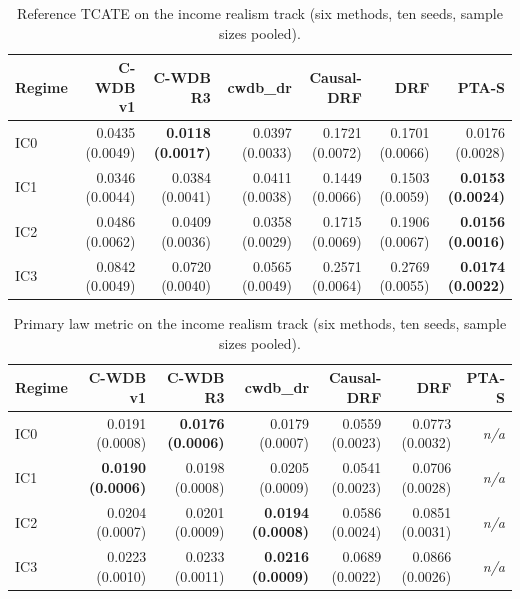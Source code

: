 \begin{table}[htbp]
\centering
\caption{Reference TCATE on the income realism track (six methods, ten seeds, sample sizes pooled).}
\label{tab:p6-income-reference_tcate_rmse}
\small
\begin{tabular}{@{}lrrrrrr@{}}
\toprule
Regime & C-WDB v1 & C-WDB R3 & cwdb\_dr & Causal-DRF & DRF & PTA-S \\ 
\midrule
IC0 & 0.0435 (0.0049) & \textbf{0.0118 (0.0017)} & 0.0397 (0.0033) & 0.1721 (0.0072) & 0.1701 (0.0066) & 0.0176 (0.0028) \\ 
IC1 & 0.0346 (0.0044) & 0.0384 (0.0041) & 0.0411 (0.0038) & 0.1449 (0.0066) & 0.1503 (0.0059) & \textbf{0.0153 (0.0024)} \\ 
IC2 & 0.0486 (0.0062) & 0.0409 (0.0036) & 0.0358 (0.0029) & 0.1715 (0.0069) & 0.1906 (0.0067) & \textbf{0.0156 (0.0016)} \\ 
IC3 & 0.0842 (0.0049) & 0.0720 (0.0040) & 0.0565 (0.0049) & 0.2571 (0.0064) & 0.2769 (0.0055) & \textbf{0.0174 (0.0022)} \\ 
\bottomrule
\end{tabular}
\end{table}


\begin{table}[htbp]
\centering
\caption{Primary law metric on the income realism track (six methods, ten seeds, sample sizes pooled).}
\label{tab:p6-income-kernel_law_error}
\small
\begin{tabular}{@{}lrrrrrr@{}}
\toprule
Regime & C-WDB v1 & C-WDB R3 & cwdb\_dr & Causal-DRF & DRF & PTA-S \\ 
\midrule
IC0 & 0.0191 (0.0008) & \textbf{0.0176 (0.0006)} & 0.0179 (0.0007) & 0.0559 (0.0023) & 0.0773 (0.0032) & \emph{n/a} \\ 
IC1 & \textbf{0.0190 (0.0006)} & 0.0198 (0.0008) & 0.0205 (0.0009) & 0.0541 (0.0023) & 0.0706 (0.0028) & \emph{n/a} \\ 
IC2 & 0.0204 (0.0007) & 0.0201 (0.0009) & \textbf{0.0194 (0.0008)} & 0.0586 (0.0024) & 0.0851 (0.0031) & \emph{n/a} \\ 
IC3 & 0.0223 (0.0010) & 0.0233 (0.0011) & \textbf{0.0216 (0.0009)} & 0.0689 (0.0022) & 0.0866 (0.0026) & \emph{n/a} \\ 
\bottomrule
\end{tabular}
\end{table}


